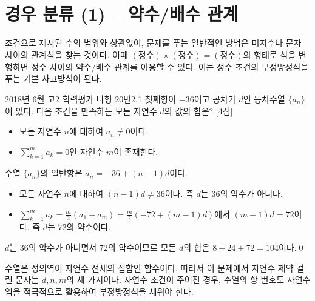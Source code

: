 \documentclass{article}
\begin{document}
\section{경우 분류 (1) -- 약수/배수 관계}
조건으로 제시된 수의 범위와 상관없이, 문제를 푸는 일반적인 방법은 미지수나 문자 사이의 관계식을 찾는 것이다. 이때 $(\text{정수})\times(\text{정수})=(\text{정수})$의 형태로 식을 변형하면 정수 사이의 약수/배수 관계를 이용할 수 있다. 이는 정수 조건의 부정방정식을 푸는 기본 사고방식이 된다.

\begin{exc}{2018년 6월 고2 학력평가 나형 20번}{2.1}
	첫째항이 $-36$이고 공차가 $d$인 등차수열 $\{a_n\}$이 있다. 다음 조건을 만족하는 모든 자연수 $d$의 값의 합은? [4점]
	\begin{hint}
		\begin{itemize}
			\item[(가)] 모든 자연수 $n$에 대하여 $a_n\ne 0$이다.
			\item[(나)] $\displaystyle\sum_{k=1}^ma_k=0$인 자연수 $m$이 존재한다.
		\end{itemize}
	\end{hint}
\end{exc}

\begin{sol}
	수열 $\{a_n\}$의 일반항은 $a_n=-36+(n-1)d$이다.
	\begin{itemize}
		\item[(가)] 모든 자연수 $n$에 대하여 $(n-1)d\ne 36$이다. 즉 $d$는 $36$의 약수가 아니다.
		\item[(나)] $\displaystyle\sum_{k=1}^ma_k=\frac{m}{2}(a_1+a_m)=\frac{m}{2}(-72+(m-1)d)$에서 $(m-1)d=72$이다. 즉 $d$는 $72$의 약수이다.
	\end{itemize}
	$d$는 $36$의 약수가 아니면서 $72$의 약수이므로 모든 $d$의 합은 $8+24+72=104$이다.\qed
\end{sol}

\begin{remark}[참고]
	수열은 정의역이 자연수 전체의 집합인 함수이다. 따라서 이 문제에서 자연수 제약 걸린 문자는 $d,n,m$의 세 가지이다. 자연수 조건이 주어진 경우, 수열의 항 번호도 자연수임을 적극적으로 활용하여 부정방정식을 세워야 한다.
\end{remark}
\end{document}
